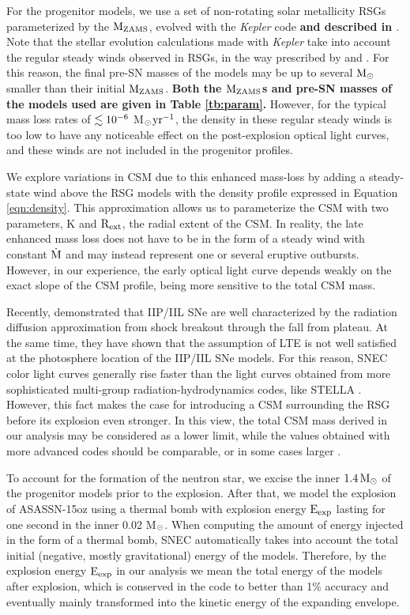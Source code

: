 \documentclass[a4paper,fleqn,usenatbib]{mnras}
\newcommand{\msunperiod}{M$\rm{_{\odot}}$}
\begin{document}
For the progenitor models, we use a set of non-rotating solar metallicity RSGs parameterized by the $\rm{M_{ZAMS}}$, evolved with the {\it Kepler} code \textbf{and described in \citet{2016sukhbold}}.
Note that the stellar evolution calculations made with {\it Kepler} take into account the regular steady winds observed in RSGs, in the way prescribed by \citet{1990nieuwenhuijzen} and \citet{1999wellstein}.
For this reason, the final pre-SN masses of the models may be up to several $\rm{M_{\odot}}$ smaller than their initial $\rm{M_{ZAMS}}$.
\textbf{Both the $\rm{M_{ZAMS}}$s and pre-SN masses of the models used are given in Table \ref{tb:param}.} 
However, for the typical mass loss rates of $\rm{\lesssim10^{-6}}$ \msunperiod $\rm{yr^{-1}}$,  the density in these regular steady winds is too low to have any noticeable effect on the post-explosion optical light curves, and these winds are not included in the progenitor profiles. 

We explore variations in CSM due to this enhanced mass-loss by adding a steady-state wind above the RSG models with the density profile expressed in Equation \ref{eqn:density}.
This approximation allows us to parameterize the CSM with two parameters, K and $\rm{R_{ext}}$, the radial extent of the CSM.
In reality, the late enhanced mass loss does not have to be in the form of a steady wind with constant $\rm{\dot{M}}$ and may instead represent one or several eruptive outbursts. However, in our experience, the early optical light curve depends weakly on the exact slope of the CSM profile, being more sensitive to the total CSM mass.

Recently, \citet{2018paxton} demonstrated that IIP/IIL SNe are well characterized by the radiation diffusion approximation from shock breakout through the fall from plateau.
At the same time, they have shown that the assumption of LTE is not well satisfied at the photosphere location of the IIP/IIL SNe models. 
For this reason, SNEC color light curves generally rise faster than the light curves obtained from more sophisticated multi-group radiation-hydrodynamics codes, like STELLA \citep{2018paxton}. 
However, this fact makes the case for introducing a CSM surrounding the RSG before its explosion even stronger.
In this view, the total CSM mass derived in our analysis may be considered as a lower limit, while the values obtained with more advanced codes should be comparable, or in some cases larger \citep{2017moriya,2018paxton}.

To account for the formation of the neutron star, we excise the inner $\rm{1.4\,M_{\odot}}$ of the progenitor models prior to the explosion. 
After that, we model the explosion of ASASSN-15oz using a thermal bomb with explosion energy $\rm{E_{exp}}$ lasting for one second in the inner 0.02 \msunperiod. 
When computing the amount of energy injected in the form of a thermal bomb, SNEC automatically takes into account the total initial (negative, mostly gravitational) energy of the models. 
Therefore, by the explosion energy $\rm{E_{exp}}$ in our analysis we mean the total energy of the models after explosion, which is conserved in the code to better than 1\% accuracy and eventually mainly transformed into the kinetic energy of the expanding envelope.
\end{document}
